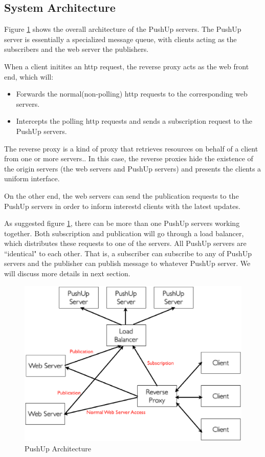 \subsection{System Architecture\\}

Figure \ref{fig:architecture} shows the overall architecture of the PushUp servers.
The PushUp server is essentially a specialized message queue, with clients 
acting as the subscribers and the web server the publishers.

When a client initites an http request, the reverse proxy acts as the web front end,
which will:
\begin{itemize}
    \item[1] Forwards the normal(non-polling) http requests to the corresponding 
             web servers.
    \item[2] Intercepts the polling http requests and sends a subscription request to 
             the PushUp servers.
\end{itemize}

The reverse proxy is a kind of proxy that retrieves
resources on behalf of a client from one or more 
servers.\cite{ReverseProxy}. In this case, the reverse
proxies hide the existence of the origin servers (the 
web servers and PushUp servers) and presents the clients
a uniform interface.

On the other end, the web servers can send the publication requests to the 
PushUp servers in order to inform interestd clients with the latest updates.

As suggested figure \ref{fig:architecture}, there can be more than one PushUp 
servers working together. Both subscription and publication will go through a 
load balancer, which distributes these requests to one of the servers. All 
PushUp servers are ``identical" to each other. That is, a subscriber can 
subscribe to any of PushUp servers and the publisher can 
publish message to whatever PushUp server. We will discuss more details in next
section.

\begin{figure}[htb!]
\centering%
    \includegraphics[scale=0.30]{figures/pushup.eps}
    \caption{PushUp Architecture}
    \label{fig:architecture}
\end{figure}

